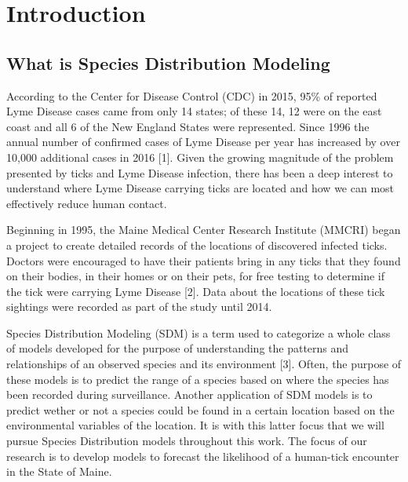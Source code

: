 
\chapter{Introduction} %

\label{Chapter1} %


\newcommand{\keyword}[1]{\textbf{#1}}
\newcommand{\tabhead}[1]{\textbf{#1}}
\newcommand{\code}[1]{\texttt{#1}}
\newcommand{\file}[1]{\texttt{\bfseries#1}}
\newcommand{\option}[1]{\texttt{\itshape#1}}



\section{What is Species Distribution Modeling}
According to the Center for Disease Control (CDC) in 2015, 95\% of reported Lyme Disease cases came from only 14 states; of these 14, 12 were on the east coast and all 6 of the New England States were represented. Since 1996 the annual number of confirmed cases of Lyme Disease per year has increased by over 10,000 additional cases in 2016 [1]. Given the growing magnitude of the problem presented by ticks and Lyme Disease infection, there has been a deep interest to understand where Lyme Disease carrying ticks are located and how we can most effectively reduce human contact. \newline

\noindent Beginning in 1995, the Maine Medical Center Research Institute (MMCRI) began a project to create detailed records of the locations of discovered infected ticks. Doctors were encouraged to have their patients bring in any ticks that they found on their bodies, in their homes or on their pets, for free testing to determine if the tick were carrying Lyme Disease [2]. Data about the locations of these tick sightings were recorded as part of the study until 2014. \newline

\noindent Species Distribution Modeling (SDM) is a term used to categorize a whole class of models developed for the purpose of understanding the patterns and relationships of an observed species and its environment [3]. Often, the purpose of these models is to predict the range of a species based on where the species has been recorded during surveillance. Another application of SDM models is to predict wether or not a species could be found in a certain location based on the environmental variables of the location. It is with this latter focus that we will pursue Species Distribution models throughout this work. The focus of our research is to develop models to forecast the likelihood of a human-tick encounter in the State of Maine.  \newline

